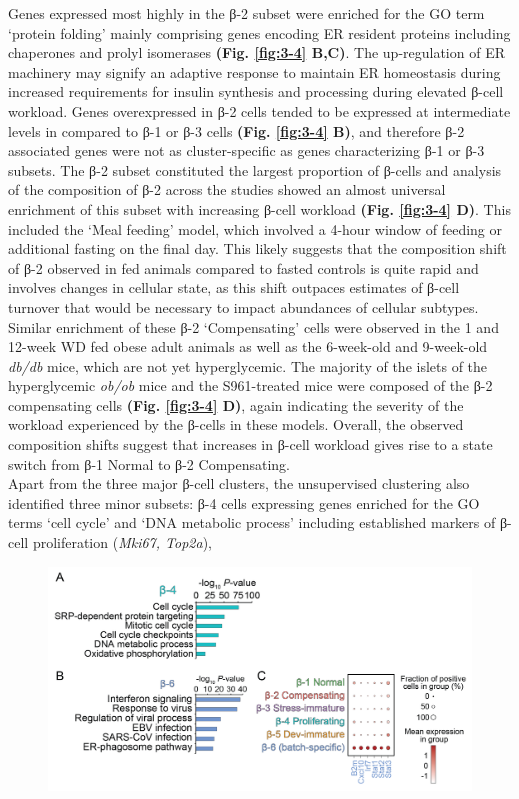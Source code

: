 Genes expressed most highly in the β-2 subset were enriched for the GO term `protein folding' mainly comprising genes encoding ER resident proteins including chaperones and prolyl isomerases \textbf{(Fig. \ref{fig:3-4} B,C)}. The up-regulation of ER machinery may signify an adaptive response to maintain ER homeostasis during increased requirements for insulin synthesis and processing during elevated β-cell workload. Genes overexpressed in β-2 cells tended to be expressed at intermediate levels in compared to β-1 or β-3 cells \textbf{(Fig. \ref{fig:3-4} B)}, and therefore β-2 associated genes were not as cluster-specific as genes characterizing β-1 or β-3 subsets. The β-2 subset constituted the largest proportion of β-cells and analysis of the composition of β-2 across the studies showed an almost universal enrichment of this subset with increasing β-cell workload \textbf{(Fig. \ref{fig:3-4} D)}. This included the `Meal feeding’ model, which involved a 4-hour window of feeding or additional fasting on the final day. This likely suggests that the composition shift of β-2 observed in fed animals compared to fasted controls is quite rapid and involves changes in cellular state, as this shift outpaces estimates of β-cell turnover that would be necessary to impact abundances of cellular subtypes. Similar enrichment of these β-2 `Compensating’ cells  were observed in the 1 and 12-week WD fed obese adult animals as well as the 6-week-old and 9-week-old \textit{db/db} mice, which are not yet hyperglycemic. The majority of the islets of the hyperglycemic \textit{ob/ob} mice and the S961-treated mice were composed of the β-2 compensating cells \textbf{(Fig. \ref{fig:3-4} D)}, again indicating the severity of the workload experienced by the β-cells in these models. Overall, the observed composition shifts suggest that increases in β-cell workload gives rise to a state switch from β-1 Normal to β-2 Compensating.\\


Apart from the three major β-cell clusters, the unsupervised clustering also identified three minor subsets: β-4 cells expressing genes enriched for the GO terms `cell cycle’ and `DNA metabolic process’ including established markers of β-cell proliferation (\textit{Mki67, Top2a}), 

\begin{figure}[b]
\centering
\includegraphics[width=12cm]{Appendix2/Fig/F3-1-v2-01.png}
\caption[Characterization of β-cell subsets using enriched markers and gene ontology]{}
\label{suppl_fig:chp3_betasubsets}
\end{figure}


